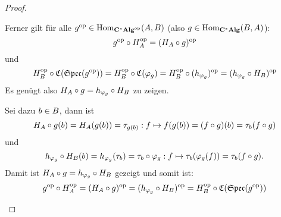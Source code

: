 \begin{proof}
\begin{itemize}
Ferner gilt für alle $g^{\mathrm{op}} \in \mathrm{Hom}_{\mathbf{C^*Alg}^{\mathrm{op}}}(A,B)$ (also $g \in \mathrm{Hom}_{\mathbf{C^*Alg}}(B,A)$):
	\[g^{\mathrm{op}}\circ H_A^{\mathrm{op}} = (H_A\circ g)^{\mathrm{op}} \]
und
	\[H_B^{\mathrm{op}} \circ \mathfrak{C}(\mathfrak{Spec}(g^{\mathrm{op}})) = H_B^{\mathrm{op}} \circ \mathfrak{C}(\varphi_g) = H_B^{\mathrm{op}} \circ (h_{\varphi_g})^{\mathrm{op}} = (h_{\varphi_g}\circ H_B)^{\mathrm{op}}\]
Es genügt also $H_A\circ g = h_{\varphi_g}\circ H_B$ zu zeigen.

Sei dazu $b \in B$, dann ist
	\[H_A\circ g (b) = H_A(g(b)) = \tau_{g(b)}: f \mapsto f(g(b)) = (f \circ g)(b) = \tau_b(f\circ g)\]
und 
	\[h_{\varphi_g}\circ H_B (b) = h_{\varphi_g}(\tau_b) = \tau_b \circ \varphi_g: f \mapsto \tau_b(\varphi_g(f)) = \tau_b(f\circ g).\]
Damit ist $H_A\circ g = h_{\varphi_g}\circ H_B$ gezeigt und somit ist:
	\[g^{\mathrm{op}}\circ H_A^{\mathrm{op}} = (H_A\circ g)^{\mathrm{op}} = (h_{\varphi_g}\circ H_B)^{\mathrm{op}} = H_B^{\mathrm{op}} \circ \mathfrak{C}(\mathfrak{Spec}(g^{\mathrm{op}}))\]
\end{itemize}
\end{proof}


